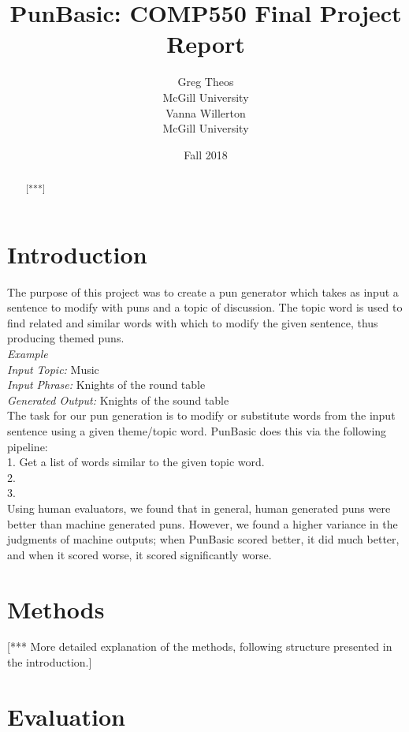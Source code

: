 \documentclass[11pt,letterpaper]{article}
\title{PunBasic: COMP550 Final Project Report}
\author{Greg Theos\\
    McGill University\\
	  \And
	Vanna Willerton\\
	McGill University\\}
\date{Fall 2018}
\begin{document}
\maketitle

\begin{abstract}
 [***]
\end{abstract}

\section{Introduction}

The purpose of this project was to create a pun generator which takes as input a sentence to modify with puns and a topic of discussion. The topic word is used to find related and similar words with which to modify the given sentence, thus producing themed puns. \\

\textit{Example}\\
\textit{Input Topic:} Music \\
\textit{Input Phrase:} Knights of the round table \\
\textit{Generated Output:} Knights of the sound table \\

The task for our pun generation is to modify or substitute words from the input sentence using a given theme/topic word. PunBasic does this via the following pipeline:\\
1. Get a list of words similar to the given topic word.\\
2. \\
3. \\

Using human evaluators, we found that in general, human generated puns were better than machine generated puns. However, we found a higher variance in the judgments of machine outputs; when PunBasic scored better, it did much better, and when it scored worse, it scored significantly worse. 

\section{Methods}

[*** More detailed explanation of the methods, following structure presented in the introduction.]

\section{Evaluation}
\end{document}

